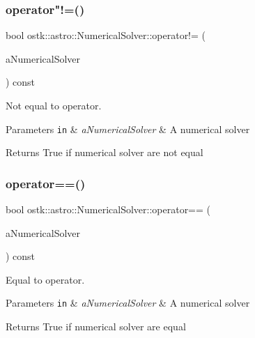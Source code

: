 \subsubsection{\texorpdfstring{operator"!=()}{operator!=()}}
{\footnotesize\ttfamily bool ostk\+::astro\+::\+Numerical\+Solver\+::operator!= (\begin{DoxyParamCaption}\item[{const \hyperlink{classostk_1_1astro_1_1_numerical_solver}{Numerical\+Solver} \&}]{a\+Numerical\+Solver }\end{DoxyParamCaption}) const}



Not equal to operator. 


\begin{DoxyParams}[1]{Parameters}
\mbox{\tt in}  & {\em a\+Numerical\+Solver} & A numerical solver \\
\hline
\end{DoxyParams}
\begin{DoxyReturn}{Returns}
True if numerical solver are not equal 
\end{DoxyReturn}
\mbox{\label{classostk_1_1astro_1_1_numerical_solver_a4ec848789b81d968cdc1d3d5003ea66a}} 
\subsubsection{\texorpdfstring{operator==()}{operator==()}}
{\footnotesize\ttfamily bool ostk\+::astro\+::\+Numerical\+Solver\+::operator== (\begin{DoxyParamCaption}\item[{const \hyperlink{classostk_1_1astro_1_1_numerical_solver}{Numerical\+Solver} \&}]{a\+Numerical\+Solver }\end{DoxyParamCaption}) const}



Equal to operator. 


\begin{DoxyParams}[1]{Parameters}
\mbox{\tt in}  & {\em a\+Numerical\+Solver} & A numerical solver \\
\hline
\end{DoxyParams}
\begin{DoxyReturn}{Returns}
True if numerical solver are equal 
\end{DoxyReturn}
\mbox{\label{classostk_1_1astro_1_1_numerical_solver_a8572e8bc097feb35d7e7ba293ffd511a}} 
